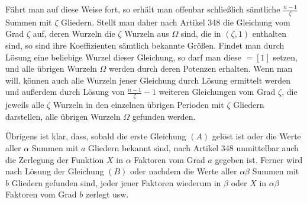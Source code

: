 Fährt man auf diese Weise fort, so erhält man offenbar schließlich sämtliche \(\frac{n-1}{\zeta}\) Summen mit \(\zeta\) Gliedern. Stellt man daher nach Artikel 348 die Gleichung vom Grad \(\zeta\) auf, deren Wurzeln die \(\zeta\) Wurzeln aus \(\Omega\) sind, die in \((\zeta,1)\) enthalten sind, so sind ihre Koeffizienten sämtlich bekannte Größen. Findet man durch Lösung eine beliebige Wurzel dieser Gleichung, so darf man diese \(=[1]\) setzen, und alle übrigen Wurzeln \(\Omega\) werden durch deren Potenzen
erhalten. Wenn man will, können auch alle Wurzeln jener Gleichung durch Lösung ermittelt werden und außerdem durch Lösung von \(\frac{n-1}{\zeta}-1\) weiteren Gleichungen vom Grad \(\zeta\), die jeweils alle \(\zeta\) Wurzeln in den einzelnen übrigen Perioden mit \(\zeta\) Gliedern darstellen, alle übrigen Wurzeln \(\Omega\) gefunden werden.

Übrigens ist klar, dass, sobald die erste Gleichung \((A)\) gelöst ist oder die Werte aller \(\alpha\) Summen mit \(a\) Gliedern bekannt sind, nach Artikel 348 unmittelbar auch die Zerlegung der Funktion \(X\) in \(\alpha\) Faktoren vom Grad \(a\) gegeben ist. Ferner wird nach Lösung der Gleichung \((B)\) oder nachdem die Werte aller \(\alpha\beta\) Summen mit \(b\) Gliedern gefunden sind, jeder jener Faktoren wiederum in \(\beta\) oder \(X\) in \(\alpha\beta\) Faktoren vom Grad \(b\) zerlegt usw.


